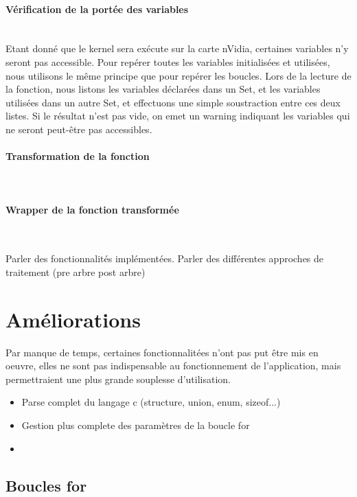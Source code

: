 \documentclass{article}
\begin{document}
	
	\paragraph{Vérification de la portée des variables}
	~~\\
	\indent
	Etant donné que le kernel sera exécute sur la carte nVidia, certaines variables n'y seront pas accessible. Pour repérer toutes les variables initialisées et utilisées, nous utilisons le même principe que pour repérer les boucles. Lors de la lecture de la fonction, nous listons les variables déclarées dans un Set, et les variables utilisées dans un autre Set, et effectuons une simple soustraction entre ces deux listes. Si le résultat n'est pas vide, on emet un warning indiquant les variables qui ne seront peut-être pas accessibles.
	
	\paragraph{Transformation de la fonction}
	~~\\
	\indent
		
	
	\paragraph{Wrapper de la fonction transformée}
	~~\\
	\indent
	
	Parler des fonctionnalités implémentées.
	Parler des différentes approches de traitement (pre arbre post arbre)

	\newpage



	
	
	
	\section{Améliorations}
	Par manque de temps, certaines fonctionnalitées n'ont pas put être mis en oeuvre, elles ne sont pas indispensable au fonctionnement de l'application, mais permettraient une plus grande souplesse d'utilisation.
	\begin{itemize}
		\item Parse complet du langage c (structure, union, enum, sizeof...)
		\item Gestion plus complete des paramètres de la boucle for
		\item 
	\end{itemize}
	
	
	\subsection{Boucles for}
	
\end{document}
